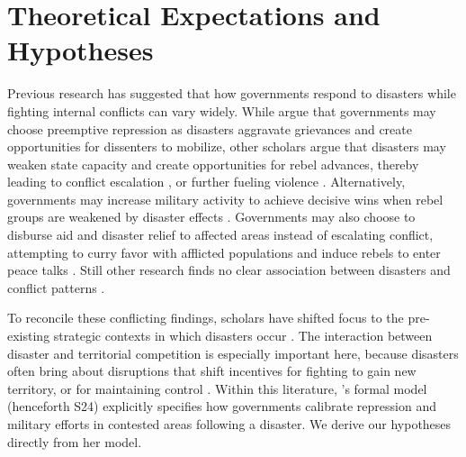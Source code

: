 \documentclass[bibtex]{article}
\begin{document}

\section*{Theoretical Expectations and Hypotheses}

Previous research has suggested that how governments respond to disasters while fighting internal conflicts can vary widely. While \cite{wood2016responding} argue that governments may choose preemptive repression as disasters aggravate grievances and create opportunities for dissenters to mobilize, other scholars argue that disasters may weaken state capacity \citep{Eastin14032016} and create opportunities for rebel advances, thereby leading to conflict escalation \citep{Berrebi_2011}, or further fueling violence \citep{Kikuta_2019, NelPhilip2008NDat, amarasinghe2025disasters}. Alternatively, governments may increase military activity to achieve decisive wins when rebel groups are weakened by disaster effects \citep{zhao_2025}. Governments may also choose to disburse aid and disaster relief to affected areas \citep{Eastin14032016, ide_rise_2023} instead of escalating conflict, attempting to curry favor with afflicted populations and induce rebels to enter peace talks \citep{tominaga_when_2021, walch2021natural}. Still other research finds no clear association between disasters and conflict patterns \citep{bergholt2012climate, Omelicheva01102011, doi:10.1177/0022343320973741}.

To reconcile these conflicting findings, scholars have shifted focus to the pre-existing strategic contexts in which disasters occur \citep{ide_2023}. The interaction between disaster and territorial competition is especially important here, because disasters often bring about disruptions that shift incentives for fighting to gain new territory, or for maintaining control \citep{wood2016responding, zhao_2025, amarasinghe2025disasters}. Within this literature, \citeauthor{sun2024strategic}'s \citeyearpar{sun2024strategic} formal model (henceforth S24) explicitly specifies how governments calibrate repression and military efforts in contested areas following a disaster. We derive our hypotheses directly from her model.
\end{document}
